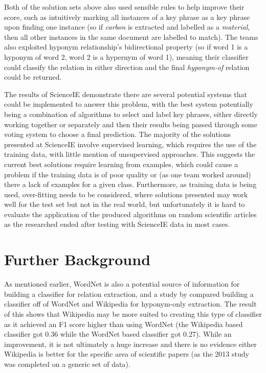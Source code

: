 Both of the solution sets above also used sensible rules to help improve their score, such as intuitively marking all instances of a key phrase as a key phrase upon finding one instance (so if \textit{carbon} is extracted and labelled as a \textit{material}, then all other instances in the same document are labelled to match). The teams also exploited hyponym relationship’s bidirectional property (so if word 1 is a hyponym of word 2, word 2 is a hypernym of word 1), meaning their classifier could classify the relation in either direction and the final \textit{hyponym-of} relation could be returned.

The results of ScienceIE demonstrate there are several potential systems that could be implemented to answer this problem, with the best system potentially being a combination of algorithms to select and label key phrases, either directly working together or separately and then their results being passed through some voting system to choose a final prediction. The majority of the solutions presented at ScienceIE involve supervised learning, which requires the use of the training data, with little mention of unsupervised approaches. This suggests the current best solutions require learning from examples, which could cause a problem if the training data is of poor quality or (as one team worked around) there a lack of examples for a given class. Furthermore, as training data is being used, over-fitting needs to be considered, where solutions presented may work well for the test set but not in the real world, but unfortunately it is hard to evaluate the application of the produced algorithms on random scientific articles as the researched ended after testing with ScienceIE data in most cases.

\section{Further Background}

As mentioned earlier, WordNet is also a potential source of information for building a classifier for relation extraction, and a study by \cite{Snow2013} compared building a classifier off of WordNet and Wikipedia for hyponym-only extraction. The result of this shows that Wikipedia may be more suited to creating this type of classifier as it achieved an F1 score higher than using WordNet (the Wikipedia based classifier got 0.36 while the WordNet based classifier got 0.27). While an improvement, it is not ultimately a huge increase and there is no evidence either Wikipedia is better for the specific area of scientific papers (as the 2013 study was completed on a generic set of data).

